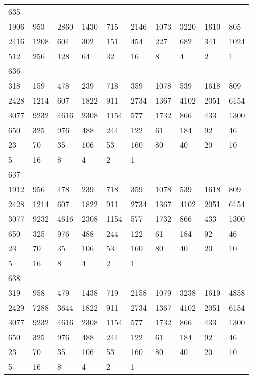 \begin{longtable}{*{10}{l}}
635&&&&&&&&&\\
1906& 953& 2860& 1430& 715& 2146& 1073& 3220& 1610& 805\\
2416& 1208& 604& 302& 151& 454& 227& 682& 341& 1024\\
512& 256& 128& 64& 32& 16& 8& 4& 2& 1\\

636&&&&&&&&&\\
318& 159& 478& 239& 718& 359& 1078& 539& 1618& 809\\
2428& 1214& 607& 1822& 911& 2734& 1367& 4102& 2051& 6154\\
3077& 9232& 4616& 2308& 1154& 577& 1732& 866& 433& 1300\\
650& 325& 976& 488& 244& 122& 61& 184& 92& 46\\
23& 70& 35& 106& 53& 160& 80& 40& 20& 10\\
5& 16& 8& 4& 2& 1& \\

637&&&&&&&&&\\
1912& 956& 478& 239& 718& 359& 1078& 539& 1618& 809\\
2428& 1214& 607& 1822& 911& 2734& 1367& 4102& 2051& 6154\\
3077& 9232& 4616& 2308& 1154& 577& 1732& 866& 433& 1300\\
650& 325& 976& 488& 244& 122& 61& 184& 92& 46\\
23& 70& 35& 106& 53& 160& 80& 40& 20& 10\\
5& 16& 8& 4& 2& 1& \\

638&&&&&&&&&\\
319& 958& 479& 1438& 719& 2158& 1079& 3238& 1619& 4858\\
2429& 7288& 3644& 1822& 911& 2734& 1367& 4102& 2051& 6154\\
3077& 9232& 4616& 2308& 1154& 577& 1732& 866& 433& 1300\\
650& 325& 976& 488& 244& 122& 61& 184& 92& 46\\
23& 70& 35& 106& 53& 160& 80& 40& 20& 10\\
5& 16& 8& 4& 2& 1& \\


\end{longtable}
